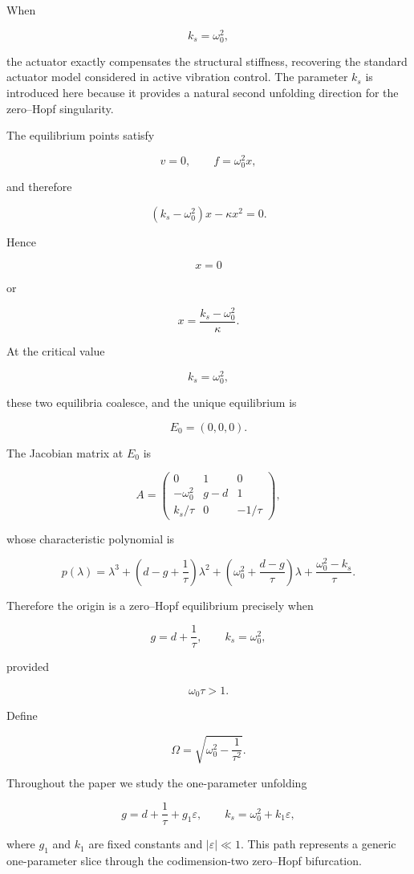 \documentclass[11pt,reqno]{amsart}
\theoremstyle{plain}
\theoremstyle{definition}
\theoremstyle{remark}
\begin{document}
When

\[
k_s=\omega_0^2,
\]

the actuator exactly compensates the structural stiffness, recovering the
standard actuator model considered in active vibration control.
The parameter $k_s$ is introduced here because it provides a natural
second unfolding direction for the zero--Hopf singularity.

The equilibrium points satisfy

\[
v=0,
\qquad
f=\omega_0^2x,
\]

and therefore

\[
(k_s-\omega_0^2)x-\kappa x^2=0.
\]

Hence

\[
x=0
\]

or

\[
x=\frac{k_s-\omega_0^2}{\kappa}.
\]

At the critical value

\[
k_s=\omega_0^2,
\]

these two equilibria coalesce, and the unique equilibrium is

\[
E_0=(0,0,0).
\]

The Jacobian matrix at $E_0$ is

\[
A=
\begin{pmatrix}
0&1&0\\
-\omega_0^2&g-d&1\\
k_s/\tau&0&-1/\tau
\end{pmatrix},
\]

whose characteristic polynomial is

\[
p(\lambda)
=
\lambda^3+
\left(d-g+\frac1\tau\right)\lambda^2+
\left(\omega_0^2+\frac{d-g}{\tau}\right)\lambda
+\frac{\omega_0^2-k_s}{\tau}.
\]

Therefore the origin is a zero--Hopf equilibrium precisely when

\[
g=d+\frac1\tau,
\qquad
k_s=\omega_0^2,
\]

provided

\[
\omega_0\tau>1.
\]

Define

\[
\Omega
=
\sqrt{\omega_0^2-\frac1{\tau^2}}.
\]

Throughout the paper we study the one-parameter unfolding

\[
g
=
d+\frac1\tau+g_1\varepsilon,
\qquad
k_s
=
\omega_0^2+k_1\varepsilon,
\]

where $g_1$ and $k_1$ are fixed constants and
$|\varepsilon|\ll1$.
This path represents a generic one-parameter slice through the
codimension-two zero--Hopf bifurcation.
\end{document}
